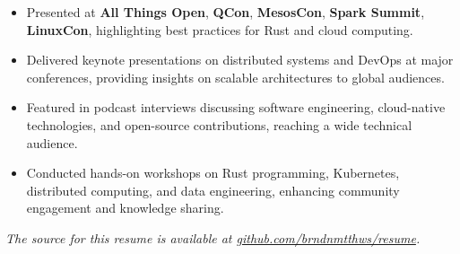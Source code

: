 \documentclass[margin,line]{resume}
\begin{document}
\begin{resume}
\begin{itemize}[nosep]
    \item Presented at \textbf{All Things Open}, \textbf{QCon}, \textbf{MesosCon}, \textbf{Spark Summit}, \textbf{LinuxCon}, highlighting best practices for Rust and cloud computing.
    \item Delivered keynote presentations on distributed systems and DevOps at major conferences, providing insights on scalable architectures to global audiences.
    \item Featured in podcast interviews discussing software engineering, cloud-native technologies, and open-source contributions, reaching a wide technical audience.
    \item Conducted hands-on workshops on Rust programming, Kubernetes, distributed computing, and data engineering, enhancing community engagement and knowledge sharing.
\end{itemize}

\end{resume}

\vspace*{\fill}

\textit{The source for this resume is available at \href{https://github.com/brndnmtthws/resume}{github.com/brndnmtthws/resume}.}
\end{document}
